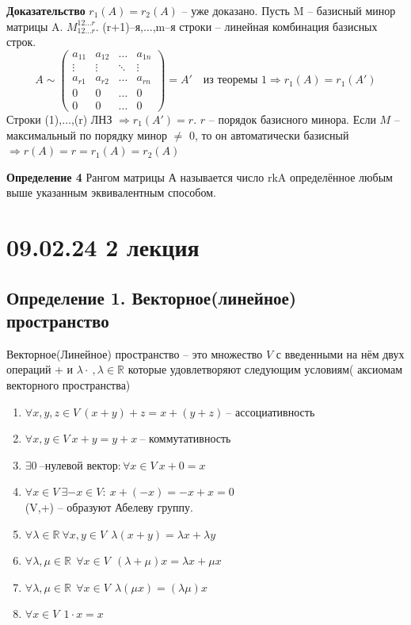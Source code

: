 \documentclass[a4paper,12pt]{article} %
\begin{document}
\textbf{Доказательство}
$r_1(A) = r_2(A)$ -- уже доказано. Пусть M -- базисный минор матрицы A. $M_{12\dotso r}^{12\dotso r}$. (r+1)--я,$\dotso$,m--я строки -- линейная комбинация базисных строк.
$$
A\sim\begin{pmatrix}
	a_{11} &  a_{12} & \dotso & a_{1n} \\
	\vdots & \vdots &\ddots & \vdots\\
	a_{r1} & a_{r2}& \dotso & a_{rn}\\
	0 & 0 &\dotso & 0\\
	0 & 0 &\dotso & 0
\end{pmatrix} = A' \quad \text{из теоремы 1} \Rightarrow r_1(A) = r_1(A')
$$
Строки (1),$\dotso$,(r) ЛНЗ $\Rightarrow r_1(A') = r$. $r$ -- порядок базисного минора. Если $M$ -- максимальный по порядку минор $\neq$ 0, то он автоматически базисный $\Rightarrow r(A) = r = r_1(A) = r_2(A)$

\textbf{Определение 4}
Рангом матрицы А называется число rkA определённое любым выше указанным эквивалентным способом.
\section{09.02.24 2 лекция}
\subsection{Определение 1. Векторное(линейное) пространство}
	\indent Векторное(Линейное) пространство -- это множество $V$ с введенными на нём двух операций + и $\lambda \cdot \ , \lambda \in \mathbb{R}$ которые удовлетворяют следующим условиям( аксиомам векторного пространства)
	\begin{enumerate}
		\item $\forall x,y,z \in V \ (x+y) +z = x+(y+z) \ \text{-- ассоциативность}$
		\item $\forall x,y \in V \ x+y = y+x \ \text{-- коммутативность}$
		\item $ \exists 0 \ \text{--нулевой вектор}: \forall x \in V \ x+0 = x $
		\item $\forall x \in V \ \exists -x \in V : \ x+(-x) = -x+x = 0$\\
		(V,+) -- образуют Абелеву группу.
		\item $\forall \lambda \in \mathbb{R} \ \forall x,y \in V \ \ \lambda (x+y) = \lambda x + \lambda y$
		\item $\forall \lambda, \mu \in \mathbb{R} \ \ \forall x \in V  \ \ ( \lambda + \mu )x = \lambda x + \mu x $
		\item $\forall \lambda,\mu \in \mathbb{R} \ \ \forall x \in V \ \  \lambda(\mu x) = (\lambda \mu) x$
		\item $\forall x \in V \ \ 1\cdot x = x$
	\end{enumerate}
	
\end{document}
